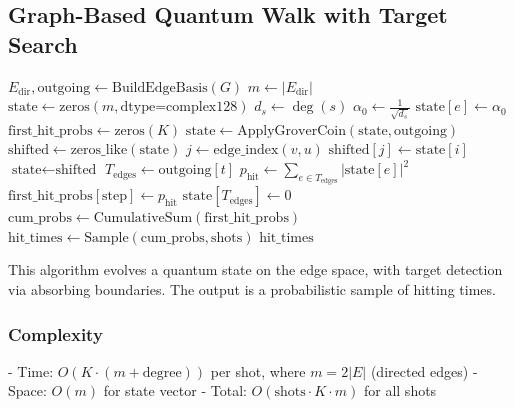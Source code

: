 \documentclass[12pt,a4paper]{article}
\begin{document}
\subsection{Graph-Based Quantum Walk with Target Search}

\begin{algorithm}[H]
\caption{Quantum Graph Target Search}
\label{alg:graph_quantum}
\begin{algorithmic}[1]
    \State {}
    \State $E_{\text{dir}}, \text{outgoing} \gets \text{BuildEdgeBasis}(G)$
    \State $m \gets |E_{\text{dir}}|$
    \State $\text{state} \gets \text{zeros}(m, \text{dtype=complex128})$
    \State {}
    \State $d_s \gets \deg(s)$
    \State $\alpha_0 \gets \frac{1}{\sqrt{d_s}}$
        \State $\text{state}[e] \gets \alpha_0$
    \EndFor
    \State {}
    \State $\text{first\_hit\_probs} \gets \text{zeros}(K)$
        \State {}
        \State $\text{state} \gets \text{ApplyGroverCoin}(\text{state}, \text{outgoing})$
        \State {}
        \State $\text{shifted} \gets \text{zeros\_like}(\text{state})$
            \State $j \gets \text{edge\_index}(v, u)$
            \State $\text{shifted}[j] \gets \text{state}[i]$
        \EndFor
        \State $\text{state} \gets \text{shifted}$
        \State {}
        \State $T_{\text{edges}} \gets \text{outgoing}[t]$
        \State $p_{\text{hit}} \gets \sum_{e \in T_{\text{edges}}} |\text{state}[e]|^2$
        \State $\text{first\_hit\_probs}[\text{step}] \gets p_{\text{hit}}$
        \State $\text{state}[T_{\text{edges}}] \gets 0$
    \EndFor
    \State {}
    \State $\text{cum\_probs} \gets \text{CumulativeSum}(\text{first\_hit\_probs})$
    \State $\text{hit\_times} \gets \text{Sample}(\text{cum\_probs}, \text{shots})$
    \State \Return $\text{hit\_times}$
    \EndProcedure
\end{algorithmic}
\end{algorithm}

This algorithm evolves a quantum state on the edge space, with target detection via absorbing boundaries. The output is a probabilistic sample of hitting times.

\subsubsection{Complexity}
- Time: $O(K \cdot (m + \text{degree}))$ per shot, where $m = 2|E|$ (directed edges)
- Space: $O(m)$ for state vector
- Total: $O(\text{shots} \cdot K \cdot m)$ for all shots
\end{document}
